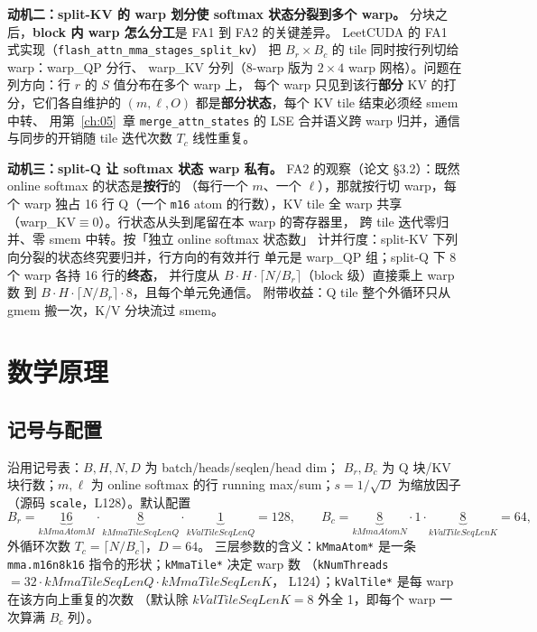 \textbf{动机二：split-KV 的 warp 划分使 softmax 状态分裂到多个 warp。}
分块之后，\textbf{block 内 warp 怎么分工}是 FA1 到 FA2 的关键差异。
LeetCUDA 的 FA1 式实现（\texttt{flash\_\allowbreak{}attn\_\allowbreak{}mma\_\allowbreak{}stages\_\allowbreak{}split\_\allowbreak{}kv}）
把 $B_r\times B_c$ 的 tile 同时按行列切给 warp：warp\_QP 分行、
warp\_KV 分列（8-warp 版为 $2\times4$ warp 网格）。问题在列方向：行 $r$ 的 $S$ 值分布在多个 warp 上，
每个 warp 只见到该行\textbf{部分} KV 的打分，它们各自维护的
$(m,\ell,O)$ 都是\textbf{部分状态}，每个 KV tile 结束必须经 smem 中转、
用第~\ref{ch:05}~章 \texttt{merge\_\allowbreak{}attn\_\allowbreak{}states} 的 LSE 合并语义跨
warp 归并，通信与同步的开销随 tile 迭代次数 $T_c$ 线性重复。

\textbf{动机三：split-Q 让 softmax 状态 warp 私有。}
FA2 的观察（论文 §3.2）：既然 online softmax 的状态是\textbf{按行}的
（每行一个 $m$、一个 $\ell$），那就按行切 warp，每个 warp 独占
16 行 Q（一个 \texttt{m16} atom 的行数），KV tile 全 warp 共享
（warp\_KV$\equiv$0）。行状态从头到尾留在本 warp 的寄存器里，
跨 tile 迭代零归并、零 smem 中转。按「独立 online softmax 状态数」
计并行度：split-KV 下列向分裂的状态终究要归并，行方向的有效并行
单元是 warp\_QP 组；split-Q 下 8 个 warp 各持 16 行的\textbf{终态}，
并行度从 $B\cdot H\cdot\lceil N/B_r\rceil$（block 级）直接乘上 warp 数
到 $B\cdot H\cdot\lceil N/B_r\rceil\cdot 8$，且每个单元免通信。
附带收益：Q tile 整个外循环只从 gmem 搬一次，K/V 分块流过 smem。

\section{数学原理}

\subsection{记号与配置}

沿用记号表：$B,H,N,D$ 为 batch/heads/seqlen/head dim；
$B_r,B_c$ 为 Q 块/KV 块行数；$m,\ell$ 为 online softmax 的行
running max/sum；$s = 1/\sqrt{D}$ 为缩放因子（源码
\texttt{scale}，L128）。默认配置
\begin{equation}
  B_r = \underbrace{16}_{kMmaAtomM}\cdot\underbrace{8}_{kMmaTileSeqLenQ}\cdot\underbrace{1}_{kValTileSeqLenQ} = 128,\qquad
  B_c = \underbrace{8}_{kMmaAtomN}\cdot 1\cdot\underbrace{8}_{kValTileSeqLenK} = 64,
  \label{eq:16-brbc}
\end{equation}
外循环次数 $T_c=\lceil N/B_c\rceil$，$D=64$。
三层参数的含义：\texttt{kMmaAtom*} 是一条 \texttt{mma.\allowbreak{}m16n8k16}
指令的形状；\texttt{kMmaTile*} 决定 warp 数
（\texttt{kNumThreads}$=32\cdot kMmaTileSeqLenQ\cdot kMmaTileSeqLenK$，
L124）；\texttt{kValTile*} 是每 warp 在该方向上重复的次数
（默认除 $kValTileSeqLenK{=}8$ 外全 1，即每个 warp 一次算满 $B_c$ 列）。

